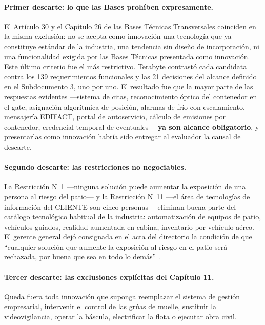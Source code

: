 \paragraph*{Primer descarte: lo que las Bases prohíben expresamente.}
El Artículo 30\textdegree{} y el Capítulo 26 de las Bases Técnicas
Transversales coinciden en la misma exclusión: no se acepta como innovación una
tecnología que ya constituye estándar de la industria, una tendencia sin diseño
de incorporación, ni una funcionalidad exigida por las Bases Técnicas
presentada como innovación. Este último criterio fue el más restrictivo.
Terabyte contrastó cada candidata contra los 139 requerimientos funcionales y
las 21 decisiones del alcance definido en el Subdocumento 3, uno por uno. El
resultado fue que la mayor parte de las respuestas evidentes —sistema de citas,
reconocimiento óptico del contenedor en el gate, asignación algorítmica de
posición, alarmas de frío con escalamiento, mensajería EDIFACT, portal de
autoservicio, cálculo de emisiones por contenedor, credencial temporal de
eventuales— \textbf{ya son alcance obligatorio}, y presentarlas como innovación
habría sido entregar al evaluador la causal de descarte.

\paragraph*{Segundo descarte: las restricciones no negociables.}
La Restricción N\textdegree{}~1 —ninguna solución puede aumentar la exposición
de una persona al riesgo del patio— y la Restricción N\textdegree{}~11 —el área
de tecnologías de información del CLIENTE son cinco personas— eliminan buena
parte del catálogo tecnológico habitual de la industria: automatización de
equipos de patio, vehículos guiados, realidad aumentada en cabina, inventario
por vehículo aéreo. El gerente general dejó consignada en el acta del
directorio la condición de que \enquote{cualquier solución que aumente la
exposición al riesgo en el patio será rechazada, por buena que sea en todo lo
demás} \Hecho.

\paragraph*{Tercer descarte: las exclusiones explícitas del Capítulo 11.}
Queda fuera toda innovación que suponga reemplazar el sistema de gestión
empresarial, intervenir el control de las grúas de muelle, sustituir la
videovigilancia, operar la báscula, electrificar la flota o ejecutar obra
civil.


